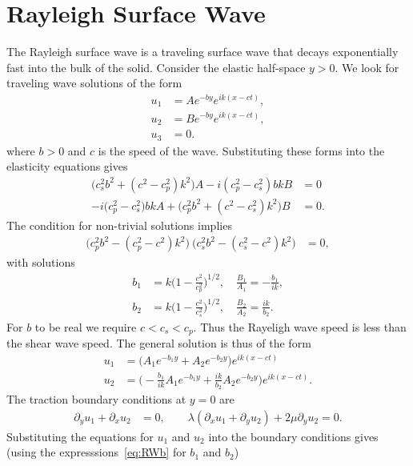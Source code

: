 \section{Rayleigh Surface Wave} \label{sec:RayleighSurfaceWave}


The Rayleigh surface wave is a traveling surface wave that decays exponentially fast into the
bulk of the solid. Consider the elastic half-space $y>0$. We look for traveling wave solutions
of the form
\begin{align}
 u_1 &= A e^{-b y } e^{ik(x-ct)}, \\
 u_2 &= B e^{-b y } e^{ik(x-ct)}, \\
 u_3 & =0.
\end{align} 
where $b>0$ and $c$ is the speed of the wave. Substituting these forms into the elasticity equations gives
\begin{align}
 \big( c_s^2 b^2 +(c^2-c_p^2)k^2 \big) A - i(c_p^2-c_s^2) b k B &= 0 \\
 -i\big( c_p^2-c_s^2\big) b k A + \big( c_p^2 b^2 + (c^2-c_s^2) k^2\big) B &= 0 .
\end{align}
The condition for non-trivial solutions implies
\begin{align}
   \big( c_p^2 b^2 - (c_p^2-c^2)k^2\big)~\big( c_s^2b^2 - (c_s^2-c^2) k^2 \big) &=0 ,
\end{align}
with solutions
\begin{align}
 b_1 &= k \big( 1 - \frac{c^2}{c_p^2} \big)^{1/2}, \quad \frac{B_1}{A_1} = -\frac{b_1}{ik},  \label{eq:RWb}  \\
 b_2 &= k \big( 1 - \frac{c^2}{c_s^2} \big)^{1/2}, \quad \frac{B_2}{A_2} = \frac{ik}{b_2}. \nonumber 
\end{align} 
For $b$ to be real we require $c < c_s < c_p$. Thus the Rayeligh wave speed is less than the shear wave speed.
The general solution is thus of the form 
\begin{align}
 u_1 &= \Big( A_1 e^{-b_1 y } + A_2 e^{-b_2 y } \Big) e^{ik(x-ct)} \\
 u_2 &= \Big( - \frac{b_1}{ik} A_1 e^{-b_1 y } + \frac{i k}{b_2} A_2 e^{-b_2 y } \Big)e^{ik(x-ct)}.
\end{align} 
The traction boundary conditions at $y=0$ are
\begin{align}
  \partial_y u_1 + \partial_x u_2 &=0, \qquad \lambda(\partial_x u_1 + \partial_y u_2 ) + 2\mu \partial_y u_2 =0.
\end{align} 
Substituting the equations for $u_1$ and $u_2$ into the boundary conditions gives (using the expresssions~\eqref{eq:RWb} for $b_1$ and $b_2$)

